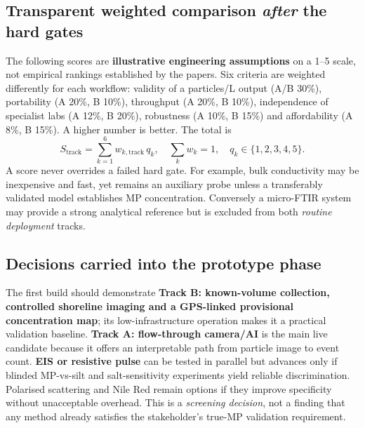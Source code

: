 \documentclass[10pt,a4paper]{article}
\begin{document}
\subsection{Transparent weighted comparison \emph{after} the hard gates}
The following scores are \textbf{illustrative engineering assumptions} on a 1--5 scale, not empirical rankings established by the papers. Six criteria are weighted differently for each workflow: validity of a particles/L output (A/B 30\%), portability (A 20\%, B 10\%), throughput (A 20\%, B 10\%), independence of specialist labs (A 12\%, B 20\%), robustness (A 10\%, B 15\%) and affordability (A 8\%, B 15\%). A higher number is better. The total is
\begin{equation}
S_{\mathrm{track}} = \sum_{k=1}^{6} w_{k,\mathrm{track}}\,q_k,\quad \sum_k w_k=1,\quad q_k\in\{1,2,3,4,5\}.
\end{equation}
A score never overrides a failed hard gate. For example, bulk conductivity may be inexpensive and fast, yet remains an auxiliary probe unless a transferably validated model establishes MP concentration. Conversely a micro-FTIR system may provide a strong analytical reference but is excluded from both \emph{routine deployment} tracks.



\subsection{Decisions carried into the prototype phase}
The first build should demonstrate \textbf{Track B: known-volume collection, controlled shoreline imaging and a GPS-linked provisional concentration map}; its low-infrastructure operation makes it a practical validation baseline. \textbf{Track A: flow-through camera/AI} is the main live candidate because it offers an interpretable path from particle image to event count. \textbf{EIS or resistive pulse} can be tested in parallel but advances only if blinded MP-vs-silt and salt-sensitivity experiments yield reliable discrimination. Polarised scattering and Nile Red remain options if they improve specificity without unacceptable overhead. This is a \emph{screening decision}, not a finding that any method already satisfies the stakeholder's true-MP validation requirement.
\end{document}
